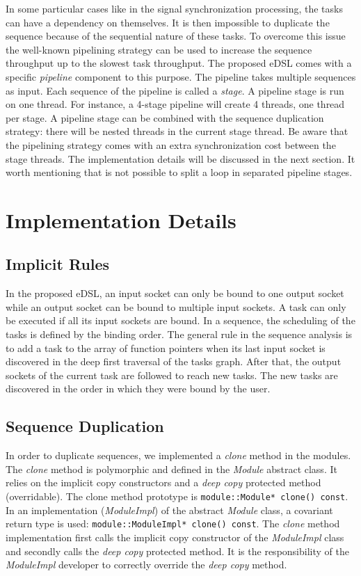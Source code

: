 In some particular cases like in the signal synchronization processing, the
tasks can have a dependency on themselves. It is then impossible to duplicate
the sequence because of the sequential nature of these tasks. To overcome this
issue the well-known pipelining strategy can be used to increase the sequence
throughput up to the slowest task throughput. The proposed eDSL comes with a
specific \emph{pipeline} component to this purpose. The pipeline takes multiple
sequences as input. Each sequence of the pipeline is called a \emph{stage}. A
pipeline stage is run on one thread. For instance, a 4-stage pipeline will
create 4 threads, one thread per stage. A pipeline stage can be combined with
the sequence duplication strategy: there will be nested threads in the current
stage thread. Be aware that the pipelining strategy comes with an extra
synchronization cost between the stage threads. The implementation details will
be discussed in the next section. It worth mentioning that is not possible to
split a loop in separated pipeline stages.

\section{Implementation Details}

\subsection{Implicit Rules}

In the proposed eDSL, an input socket can only be bound to one output socket
while an output socket can be bound to multiple input sockets. A task can only
be executed if all its input sockets are bound. In a sequence, the scheduling of
the tasks is defined by the binding order. The general rule in the sequence
analysis is to add a task to the array of function pointers when its last input
socket is discovered in the deep first traversal of the tasks graph. After that,
the output sockets of the current task are followed to reach new tasks. The new
tasks are discovered in the order in which they were bound by the user.

\subsection{Sequence Duplication}

In order to duplicate sequences, we implemented a \emph{clone} method in the
modules. The \emph{clone} method is polymorphic and defined in the \emph{Module}
abstract class. It relies on the implicit copy constructors and a \emph{deep
copy} protected method (overridable). The clone method prototype is
\verb|module::Module* clone() const|. In an implementation (\emph{ModuleImpl})
of the abstract \emph{Module} class, a covariant return type is used:
\verb|module::ModuleImpl* clone() const|. The \emph{clone} method implementation
first calls the implicit copy constructor of the \emph{ModuleImpl} class and
secondly calls the \emph{deep copy} protected method. It is the responsibility
of the \emph{ModuleImpl} developer to correctly override the \emph{deep copy}
method.

